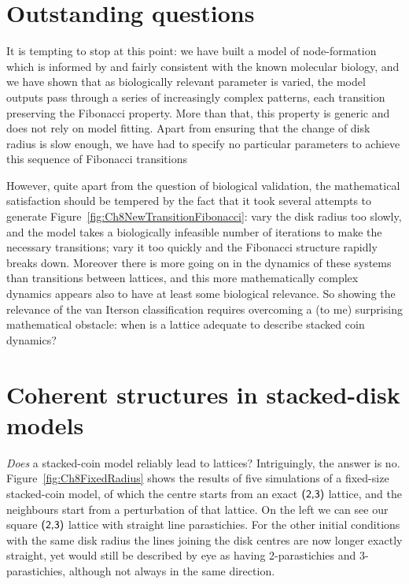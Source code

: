 \clearpage
\section{Outstanding questions} 


It is tempting to stop at this point: we have built a model of node-formation which is informed by and fairly consistent with the known molecular biology, and we have shown that as biologically relevant parameter is varied, the model outputs pass through a series of increasingly complex patterns, each transition preserving the Fibonacci property. More than that, this property is generic and does not rely on model fitting. Apart from ensuring that the change of disk radius is slow enough, we have had to specify no particular parameters to achieve this sequence of Fibonacci transitions

However, quite apart from the question of biological validation, the mathematical satisfaction should be tempered by the fact that it took several attempts to generate Figure~\ref{fig:Ch8NewTransitionFibonacci}: vary the disk radius too slowly, and the model takes a biologically infeasible number of iterations to make the necessary transitions; vary it too quickly and the Fibonacci structure rapidly breaks down. 
Moreover there is more going on in the dynamics of these systems than transitions between lattices, and this more mathematically complex dynamics appears also to have at least some biological relevance.  So showing the   relevance of the van Iterson classification requires overcoming  a (to me) surprising mathematical obstacle: when is a lattice  adequate to describe stacked coin dynamics?

\clearpage
\section{Coherent structures in stacked-disk models}

\textit{Does} a stacked-coin model reliably lead to lattices? Intriguingly, the answer is no. 
Figure~\ref{fig:Ch8FixedRadius} shows the results of five simulations of a fixed-size stacked-coin model, of which the centre starts from an exact $\textsf{(2,3)}$ lattice, and the neighbours start from a perturbation of that lattice.
On the left we can see our square $\textsf{(2,3)}$ lattice with straight line parastichies. For the other initial conditions with the same disk radius the lines joining the disk centres are now longer exactly straight, yet would still be described by eye as having 2-parastichies and 3-parastichies, although not always in the same direction.

